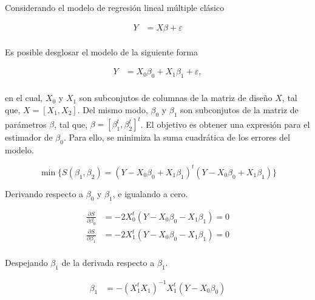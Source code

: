 \documentclass[
  11pt,
]{book}
\theoremstyle{definition}
\theoremstyle{definition}
\theoremstyle{definition}
\theoremstyle{definition}
\theoremstyle{remark}
\begin{document}
Considerando el modelo de regresión lineal múltiple clásico

\begin{equation}
\begin{split}
Y &= X\beta + \varepsilon\\
\end{split}
\label{eq:RLM-clasico}
\end{equation}

Es posible desglosar el modelo de la siguiente forma

\begin{equation}
\begin{split}
Y &= X_0\beta_0 + X_1\beta_1 + \varepsilon,\\
\end{split}
\label{eq:RLM-clasico2}
\end{equation}

en el cual, \(X_0\) y \(X_1\) son subconjutos de columnas de la matriz de diseño \(X\), tal que, \(X = [X_1,X_2]\). Del mismo modo, \(\beta_0\) y \(\beta_1\) son subconjutos de la matriz de parámetros \(\beta\), tal que, \(\beta = [\beta_1^t,\beta_2^t]^t\). El objetivo es obtener una expresión para el estimador de \(\beta_0\). Para ello, se minimiza la suma cuadrática de los errores del modelo.

\begin{equation}
\min\lbrace S(\beta_1, \beta_2) = (Y - X_0\beta_0 + X_1\beta_1)^t(Y - X_0\beta_0 + X_1\beta_1)  \rbrace
\label{eq:RLM-clasico3}
\end{equation}

Derivando respecto a \(\beta_0\) y \(\beta_1\), e igualando a cero.

\begin{equation}
\begin{split}
\frac{\partial S}{\partial \beta_0} &= -2X^t_0(Y-X_0\beta_0-X_1\beta_1) = 0\\
\frac{\partial S}{\partial \beta_1} &= -2X^t_1(Y-X_0\beta_0-X_1\beta_1) = 0\\
\end{split}
\label{eq:RLM-clasico4}
\end{equation}

Despejando \(\beta_1\) de la derivada respecto a \(\beta_1\).

\begin{equation}
\begin{split}
\beta_1 &= -(X_1^tX_1)^{-1}X_1^t(Y-X_0\beta_0)\\
\end{split}
\label{eq:RLM-clasico5}
\end{equation}
\end{document}
